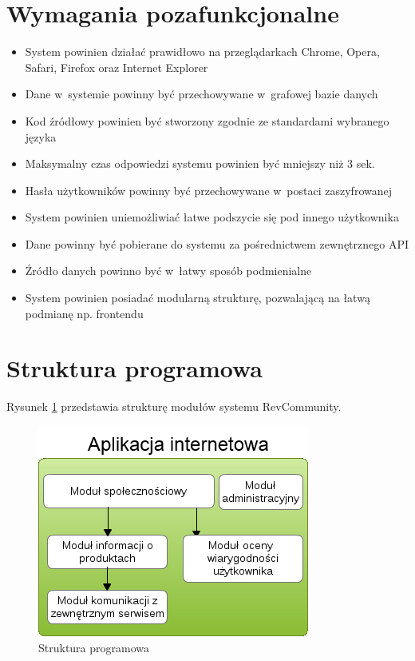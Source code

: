 \section{Wymagania pozafunkcjonalne}
\begin{itemize}
\item System powinien działać prawidłowo na przeglądarkach Chrome, Opera, Safari, Firefox oraz Internet Explorer
\item Dane w~systemie powinny być przechowywane w~grafowej bazie danych
\item Kod źródłowy powinien być stworzony zgodnie ze standardami wybranego języka
\item Maksymalny czas odpowiedzi systemu powinien być mniejszy niż 3 sek.
\item Hasła użytkowników powinny być przechowywane w~postaci zaszyfrowanej
\item System powinien uniemożliwiać łatwe podszycie się pod innego użytkownika 
\item Dane powinny być pobierane do systemu za pośrednictwem zewnętrznego API
\item Źródło danych powinno być w~łatwy sposób podmienialne
\item System powinien posiadać modularną strukturę, pozwalającą na łatwą podmianę np. frontendu
\end{itemize}

\newpage

\section{Struktura programowa}

Rysunek \ref{fig:modules} przedstawia strukturę modułów systemu RevCommunity.

\begin{figure}[H]
	\centering
	\includegraphics[scale=0.9]{images/modules.png}
	\caption{Struktura programowa}
	\label{fig:modules}
\end{figure}

